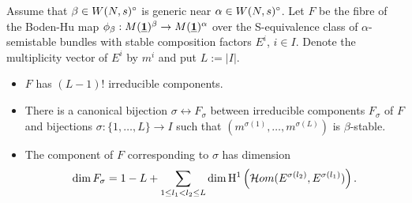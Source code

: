 \documentclass{article}
\begin{document}
\begin{thm} \label{mainthm}
  Assume that $\beta \in W(N, s)^{\circ}$ is generic near $\alpha \in W(N, s)^{\circ}$. Let $F$ be the fibre of the Boden-Hu map $\phi_{\beta}: M(\underline{\mathbf{1}})^{\beta}
  \to M(\underline{\mathbf{1}})^{\alpha}$ over the S-equivalence class of $\alpha$-semistable bundles with stable composition factors $E^i$, $i \in I$. Denote the
  multiplicity vector of $E^i$ by $m^i$ and put $L := |I|$.
  \begin{itemize}
   \item[i)] $F$ has $(L-1)!$ irreducible components.
   \item[ii)] There is a canonical bijection $\sigma \leftrightarrow F_{\sigma}$ between irreducible components $F_{\sigma}$ of $F$ and bijections
    $\sigma: \{1, \ldots, L\} \to I$ such that $(m^{\sigma(1)}, \ldots, m^{\sigma(L)})$ is $\beta$-stable.
   \item[iii)] The component of $F$ corresponding to $\sigma$ has dimension
    \begin{displaymath}
      \dim F_{\sigma} = 1 - L + \sum_{1 \leq l_1 < l_2 \leq L} \dim \mathrm{H}^1 \left( \mathcal{H}om( E^{\sigma(l_2)}, E^{\sigma(l_1)}) \right).
    \end{displaymath}
  \end{itemize}
\end{thm}
\end{document}

